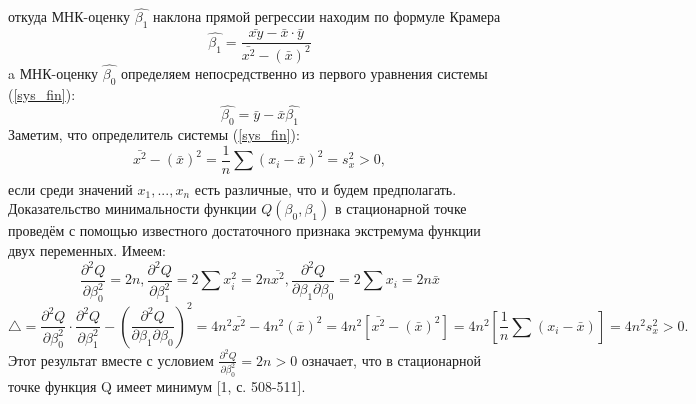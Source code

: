 \documentclass[a4paper,14pt]{article}
\begin{document}
	откуда МНК-оценку $\hat{\beta_1}$ наклона прямой регрессии находим по формуле Крамера
	\begin{equation}
		\hat{\beta_{1}} = \frac{\bar{xy} - \bar{x} \cdot \bar{y}}{\bar{x^{2}} - (\bar{x})^{2}}
		\label{beta_1_new}
	\end{equation}
	a МНК-оценку $\hat{\beta_0}$  определяем непосредственно из первого уравнения системы (\ref{sys_fin}):
	\begin{equation}
		\hat{\beta_{0}} = \bar{y} - \bar{x}\hat{\beta_{1}}
		\label{beta_0_new}
	\end{equation}
	Заметим, что определитель системы (\ref{sys_fin}):
	\begin{equation}
		\bar{x^{2}} - (\bar{x})^{2} = \frac{1}{n}\sum_{}{}{(x_{i} - \bar{x})^{2}} = s_{x}^{2} > 0, 
	\end{equation}
	если среди значений $x_{1},...,x_{n}$ есть различные, что и будем предполагать.
	\newline
	Доказательство минимальности функции $Q(\beta_{0}, \beta_{1})$ в стационарной точке проведём с помощью известного достаточного признака экстремума функции двух переменных. Имеем:
	\begin{equation}
		\frac{\partial ^{2} Q}{\partial \beta_{0}^{2}} = 2n, 
		\frac{\partial ^{2} Q}{\partial \beta_{1}^{2}} = 2\sum_{}{}{x_{i}^{2}} = 2n\bar{x^{2}}, 
		\frac{\partial ^{2} Q}{\partial \beta_{1} \partial \beta_{0}} = 2\sum_{}{}{x_{i}} = 2n\bar{x}
		\label{frac_eq}
	\end{equation}
	\begin{equation}
		\bigtriangleup = \frac{\partial^{2}Q}{\partial \beta_{0}^{2}} \cdot \frac{\partial^{2}Q}{\partial \beta_{1}^{2}} - (\frac{\partial^{2}Q}{\partial \beta_{1} \partial \beta_{0}})^{2} = 
		4n^{2}\bar{x^{2}} - 4n^2(\bar{x})^{2} = 
		4n^{2}\left[\bar{x^{2}} - (\bar{x})^{2}\right] = 4n^{2}\left[ \frac{1}{n}\sum{}_{}{(x_{i} - \bar{x})}\right] = 4n^{2}s_{x}^{2} > 0.
		\label{det_sys}
	\end{equation}
	Этот результат вместе с условием $\frac{\partial^{2}Q}{\partial \beta_{0}^{2}} = 2n > 0$ означает, что в стационарной точке функция Q имеет минимум [1, с. 508-511].
	
\end{document}

